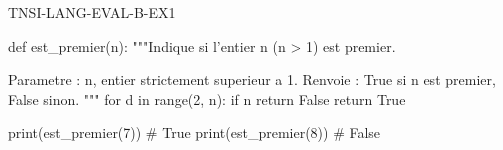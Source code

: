 %
%
\begin{corrige}{TNSI-LANG-EVAL-B-EX1}
\begin{python}
def est_premier(n):
    """Indique si l'entier n (n > 1) est premier.

    Parametre : n, entier strictement superieur a 1.
    Renvoie : True si n est premier, False sinon.
    """
    for d in range(2, n):
        if n %
            return False
    return True

print(est_premier(7))  # True
print(est_premier(8))  # False
\end{python}
\end{corrige}

